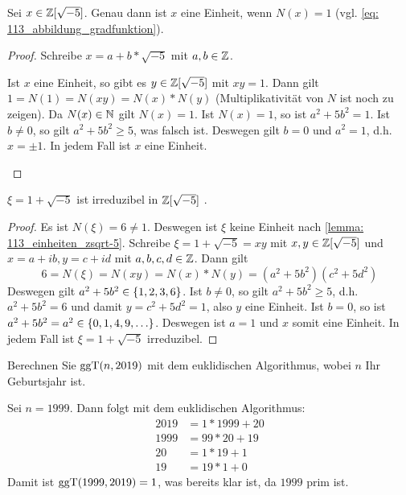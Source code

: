 \begin{exercisePage}
	\setcounter{taskcount}{105}
%
    \newcommand{\zsqrt}{\ensuremath{\Z [\sqrt{-5}]} }
%
    \begin{lemma} \label{lemma: 113_einheiten_zsqrt-5}
        Sei $x \in \zsqrt$. Genau dann ist $x$ eine Einheit, wenn $N(x) = 1$ (vgl. \cref{eq: 113_abbildung_gradfunktion}).
    \end{lemma}
    \begin{proof}
        Schreibe $x = a + b*\sqrt{-5}$ mit $a,b \in \mathbb{Z}$.
        \begin{proof-equivalence}[nopreskip]
            \hinrichtung Ist $x$ eine Einheit, so gibt es $y \in \zsqrt$ mit $xy = 1$. Dann gilt $1 = N(1) = N(xy) = N(x) * N(y)$ (Multiplikativität von $N$ ist noch zu zeigen). Da $N(x) \in \mathbb{N}$ gilt $N(x) = 1$.
            \rueckrichtung Ist $N(x) = 1$, so ist $a^2 + 5b^2 = 1$. Ist $b \neq 0$, so gilt $a^2 + 5b^2 \geq 5$, was falsch ist. Deswegen gilt $b=0$ und $a^2=1$, d.h. $x = \pm 1$. In jedem Fall ist $x$ eine Einheit.
        \end{proof-equivalence}
    \end{proof}

    \begin{lemma} \label{lemma: 113_irreduzibelzsqrt-5}
        $\xi = 1 + \sqrt{-5}$ ist irreduzibel in \zsqrt.
    \end{lemma}
    \begin{proof}
        Es ist $N(\xi) = 6 \neq 1$. Deswegen ist $\xi$ keine Einheit nach \cref{lemma: 113_einheiten_zsqrt-5}. Schreibe $\xi = 1 + \sqrt{-5} = xy$ mit $x,y \in \zsqrt$ und $x = a + ib, y = c + id$ mit $a,b,c,d \in \mathbb{Z}$. Dann gilt
        \begin{equation*}
            6 = N(\xi) = N(xy) = N(x) * N(y) = (a^2 + 5b^2) (c^2 + 5d^2)
        \end{equation*}
        Deswegen gilt $a^2 + 5b^2 \in \left\{ 1,2,3,6 \right\}$. Ist $b \neq 0$, so gilt $a^2 + 5b^2 \geq 5$, d.h. $a^2 + 5b^2 = 6$ und damit $y = c^2 + 5d^2 = 1$, also $y$ eine Einheit. Ist $b = 0$, so ist $a^2 + 5b^2 = a^2 \in \menge{0,1,4,9, \dots}$. Deswegen ist $a=1$ und $x$ somit eine Einheit. In jedem Fall ist $\xi = 1 + \sqrt{-5}$ irreduzibel.
    \end{proof}

	\begin{exercise}[Vorbereitung]
		Berechnen Sie $\operatorname{ggT}(n, 2019)$ mit dem euklidischen Algorithmus, wobei $n$ Ihr Geburtsjahr ist.
	\end{exercise}
	\begin{solution}
		Sei $n=1999$. Dann folgt mit dem euklidischen Algorithmus:
		\begin{align*}
			2019 &= 1*1999 + 20 \\
			1999 &= 99*20  + 19 \\
			20   &= 1*19   + 1 \\
			19   &= 19*1   + 0 
		\end{align*}
		Damit ist $\operatorname{ggT}(1999,2019) = 1$, was bereits klar ist, da $1999$ prim ist.
	\end{solution}
    

\end{exercisePage}
